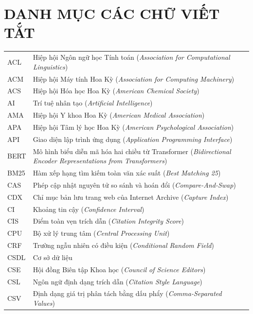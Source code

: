 \chapter*{DANH MỤC CÁC CHỮ VIẾT TẮT}

{\renewcommand{\arraystretch}{1.02}
\begin{longtable}{P{0.22}P{0.78}}
\endfirsthead
\endhead
\endfoot
\endlastfoot
ACL & Hiệp hội Ngôn ngữ học Tính toán (\textit{Association for Computational Linguistics}) \\
ACM & Hiệp hội Máy tính Hoa Kỳ (\textit{Association for Computing Machinery}) \\
ACS & Hiệp hội Hóa học Hoa Kỳ (\textit{American Chemical Society}) \\
AI & Trí tuệ nhân tạo (\textit{Artificial Intelligence}) \\
AMA & Hiệp hội Y khoa Hoa Kỳ (\textit{American Medical Association}) \\
APA & Hiệp hội Tâm lý học Hoa Kỳ (\textit{American Psychological Association}) \\
API & Giao diện lập trình ứng dụng (\textit{Application Programming Interface}) \\
BERT & Mô hình biểu diễn mã hóa hai chiều từ Transformer (\textit{Bidirectional Encoder Representations from Transformers}) \\
BM25 & Hàm xếp hạng tìm kiếm toàn văn xác suất (\textit{Best Matching 25}) \\
CAS & Phép cập nhật nguyên tử so sánh và hoán đổi (\textit{Compare-And-Swap}) \\
CDX & Chỉ mục bản lưu trang web của Internet Archive (\textit{Capture Index}) \\
CI & Khoảng tin cậy (\textit{Confidence Interval}) \\
CIS & Điểm toàn vẹn trích dẫn (\textit{Citation Integrity Score}) \\
CPU & Bộ xử lý trung tâm (\textit{Central Processing Unit}) \\
CRF & Trường ngẫu nhiên có điều kiện (\textit{Conditional Random Field}) \\
CSDL & Cơ sở dữ liệu \\
CSE & Hội đồng Biên tập Khoa học (\textit{Council of Science Editors}) \\
CSL & Ngôn ngữ định dạng trích dẫn (\textit{Citation Style Language}) \\
CSV & Định dạng giá trị phân tách bằng dấu phẩy (\textit{Comma-Separated Values}) \\

\end{longtable}}
